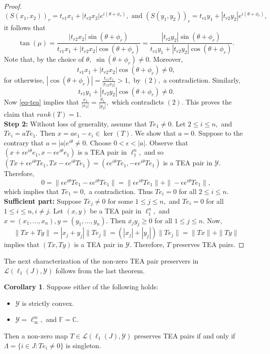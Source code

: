 \documentclass{amsart}
\theoremstyle{definition}
\newtheorem{cor}[theorem]{Corollary}
\theoremstyle{remark}
\numberwithin{equation}{section}
\begin{document}
\begin{proof}
$$(S(x_1,x_2))_r=t_{r1}x_1+|t_{r2}x_2| e^{i(\theta+\phi_r)}, \text{ and } (S(y_1,y_2))_r=t_{r1}y_1+|t_{r2}y_2| e^{i(\theta+\phi_r)},$$ it follows that
\begin{equation}\label{eq-tea}
\tan(\mu)=\frac{|t_{r2}x_2|\sin(\theta+\phi_r)}{t_{r1}x_1+|t_{r2}x_2|\cos(\theta+\phi_r)}=\frac{|t_{r2}y_2|\sin(\theta+\phi_r)}{t_{r1}y_1+|t_{r2}y_2|\cos(\theta+\phi_r)}.
\end{equation}%
Note that, by the choice of $\theta,$ $\sin(\theta+\phi_r)\neq 0.$ Moreover,
$$t_{r1}x_1+|t_{r2}x_2|\cos(\theta+\phi_r)\neq 0,$$ for otherwise, $|\cos(\theta+\phi_r)|=\frac{t_{r1}x_1}{|t_{r2}x_2|}>1,$ by $(2),$ a contradiction. Similarly, $$t_{r1}y_1+|t_{r2}y_2|\cos(\theta+\phi_r)\neq 0.$$
Now \eqref{eq-tea} implies that $\frac{x_1}{|x_2|}=\frac{y_1}{|y_2|},$ which contradicts $(2).$ This proves the claim that $rank(T)= 1.$ \\
\textbf{Step 2:}  Without loss of generality, assume that $Te_1\neq 0.$ Let $2\leq i\leq n,$ and $Te_i=aTe_1.$ Then $x=ae_1-e_i\in \ker(T).$  We show that $a=0.$  Suppose to the contrary that $a=|a|e^{i\theta}\neq 0.$ Choose $0<\epsilon<|a|.$ Observe that $(x+\epsilon e^{i\theta}e_1,x-\epsilon e^{i\theta}e_1)$  is a TEA pair in $\ell_1^n,$ and so $(Tx+\epsilon e^{i\theta}Te_1,Tx-\epsilon e^{i\theta}Te_1)=(\epsilon e^{i\theta}Te_1,-\epsilon e^{i\theta}Te_1)$ is a TEA pair in $\mathcal{Y}.$ Therefore,
\[0=\|\epsilon e^{i\theta}Te_1-\epsilon e^{i\theta}Te_1\|=\|\epsilon e^{i\theta}Te_1\|+\|-\epsilon e^{i\theta}Te_1\|,\]
which implies that $Te_1=0,$ a contradiction. Thus  $Te_i=0$ for all $2\leq i\leq n.$\\

\textbf{Sufficient part:} Suppose $Te_j\neq 0$ for some $1\leq j\leq n,$ and $Te_i=0$ for all $1\leq i\leq n, i\neq j.$ Let $(x,y)$ be a TEA pair in $\ell_1^n,$  and $x=(x_1,\ldots,x_n), y=(y_1,\ldots,y_n).$ Then $\overline{x_j}y_j\geq 0$ for all $1\leq j\leq n.$ %
Now, $$\|Tx+Ty\|=|x_j+y_j|\|Te_j\|=(|x_j|+|y_j|)\|Te_j\|=\|Tx\|+\|Ty\|$$ implies that $(Tx,Ty)$ is a TEA pair in $\mathcal{Y}.$ Therefore, $T$ preserves TEA pairs. 
\end{proof}
 The next characterization of the non-zero TEA pair preservers in  $\mathcal{L}(\ell_1(J),\mathcal{Y})$ follows from the last theorem.
\begin{cor}\label{cor-teainf}
	 Suppose either of the following holds:
	\begin{itemize}
		\item $\mathcal{Y}$ is strictly convex. 
		\item $\mathcal{Y}=\ell_\infty^m,$ and $\mathbb{F}=\mathbb{C}.$	
	\end{itemize}  Then a non-zero map $T\in \mathcal{L}(\ell_1(J),\mathcal{Y})$ preserves TEA pairs if and only if $\Lambda=\{i\in J:Te_i\neq 0\}$ is singleton.
\end{cor}
\end{document}
